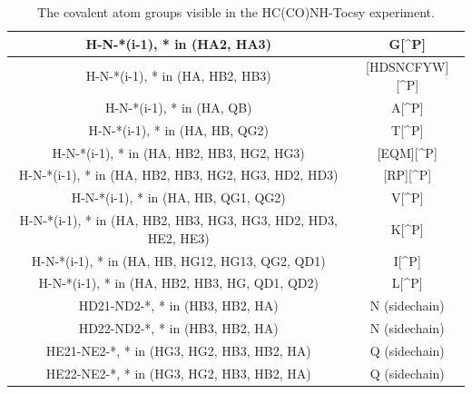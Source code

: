 \begin{table}
  \begin{tabular}{ | c | c | }
    \hline
    H-N-*(i-1), * in (HA2, HA3)                         &  G[\^{}P]             \\  \hline
    H-N-*(i-1), * in (HA, HB2, HB3)                     &  [HDSNCFYW][\^{}P]    \\  \hline
    H-N-*(i-1), * in (HA, QB)                           &  A[\^{}P]             \\  \hline
    H-N-*(i-1), * in (HA, HB, QG2)                      &  T[\^{}P]             \\  \hline
    H-N-*(i-1), * in (HA, HB2, HB3, HG2, HG3)           &  [EQM][\^{}P]         \\  \hline
    H-N-*(i-1), * in (HA, HB2, HB3, HG2, HG3, HD2, HD3) &  [RP][\^{}P]          \\  \hline
    H-N-*(i-1), * in (HA, HB, QG1, QG2)                 &  V[\^{}P]             \\  \hline
    H-N-*(i-1), * in (HA, HB2, HB3, HG3, HG3, HD2, HD3, HE2, HE3)   &  K[\^{}P] \\  \hline
    H-N-*(i-1), * in (HA, HB, HG12, HG13, QG2, QD1)     &  I[\^{}P]             \\  \hline
    H-N-*(i-1), * in (HA, HB2, HB3, HG, QD1, QD2)       &  L[\^{}P]             \\  \hline
    HD21-ND2-*, * in (HB3, HB2, HA)   &  N (sidechain)                  \\  \hline
    HD22-ND2-*, * in (HB3, HB2, HA)   &  N (sidechain)                  \\  \hline
    HE21-NE2-*, * in (HG3, HG2, HB3, HB2, HA)   &  Q (sidechain)        \\  \hline
    HE22-NE2-*, * in (HG3, HG2, HB3, HB2, HA)   &  Q (sidechain)        \\  \hline
  \end{tabular}
  \caption{The covalent atom groups visible in the HC(CO)NH-Tocsy experiment.}
  \label{hcconh_peaktypes}
\end{table}


